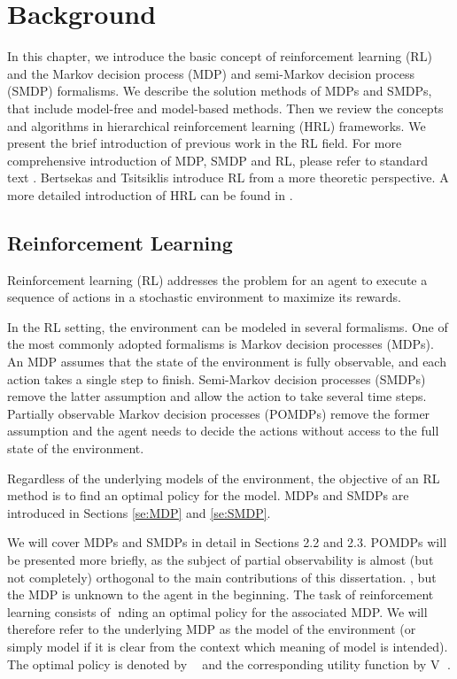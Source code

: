 \chapter{Background}
\label{ch:RL}

In this chapter, we introduce the basic concept of reinforcement learning (RL)
and the Markov decision process (MDP) and semi-Markov decision process (SMDP) formalisms.
We describe the solution methods of MDPs and SMDPs, that include model-free and model-based 
methods. Then we review the concepts and algorithms in hierarchical reinforcement learning (HRL) frameworks. 
We present the brief introduction of previous work in the RL field.
For more comprehensive introduction of MDP, SMDP and RL, please refer to standard text
\cite{howard1960, Puterman94, SuttonIntro, KevinIntro}.
Bertsekas and Tsitsiklis \cite{Neurodynamic} introduce RL from a more theoretic perspective.
A more detailed introduction of HRL can be found in \cite{HRLSurvey}.

\section{Reinforcement Learning}
Reinforcement learning (RL) addresses the problem for an agent to execute a sequence of actions
in a stochastic environment to maximize its rewards. 

In the RL setting, the environment can be modeled in several formalisms.
One of the most commonly adopted formalisms is Markov decision processes (MDPs).
An MDP assumes that the state of the environment is fully observable, and each action takes a single
step to finish. Semi-Markov decision processes (SMDPs) remove the latter assumption and allow
the action to take several time steps. Partially observable Markov decision processes (POMDPs) remove
the former assumption and the agent needs to decide the actions without access to the full state
of the environment.

Regardless of the underlying models of the environment, the objective of an RL method is
to find an optimal policy for the model. MDPs and SMDPs are introduced in Sections \ref{se:MDP} and \ref{se:SMDP}.


We will cover MDPs and SMDPs in detail
in Sections 2.2 and 2.3. POMDPs will be presented more briefly, as the subject of partial
observability is almost (but not completely) orthogonal to the main contributions of this
dissertation.
, but
the MDP is unknown to the agent in the beginning. 
The task of reinforcement learning
consists of nding an optimal policy for the associated MDP. We will therefore
refer to the underlying MDP as the model of the environment (or simply model
if it is clear from the context which meaning of model is intended). The optimal
policy is denoted by  and the corresponding utility function by V .

